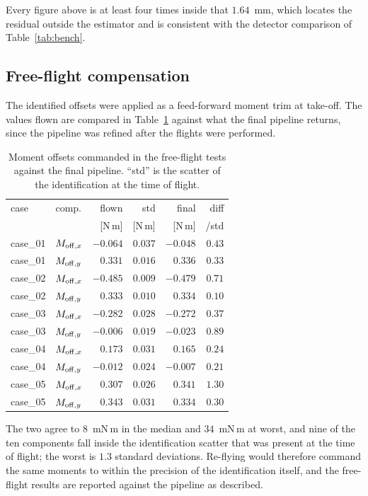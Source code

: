 Every figure above is at least four times inside that $1.64$~mm, which
locates the residual outside the estimator and is consistent with the
detector comparison of Table~\ref{tab:bench}.

\subsection{Free-flight compensation}

The identified offsets were applied as a feed-forward moment trim at
take-off. The values flown are compared in Table~\ref{tab:flown}
against what the final pipeline returns, since the pipeline was
refined after the flights were performed.

\begin{table}[t]
\centering
\caption{Moment offsets commanded in the free-flight tests against the
final pipeline. ``std'' is the scatter of the identification at the
time of flight.}
\label{tab:flown}
\small
\setlength{\tabcolsep}{4pt}
\begin{tabular}{@{}ll rrr r@{}}
\hline
case & comp. & flown & std & final & diff \\
 & & [N\,m] & [N\,m] & [N\,m] & /std \\
\hline
case\_01 & $M_{{\rm off},x}$ & $-0.064$ & $0.037$ & $-0.048$ & $0.43$\\
case\_01 & $M_{{\rm off},y}$ & $0.331$  & $0.016$ & $0.336$  & $0.33$\\
case\_02 & $M_{{\rm off},x}$ & $-0.485$ & $0.009$ & $-0.479$ & $0.71$\\
case\_02 & $M_{{\rm off},y}$ & $0.333$  & $0.010$ & $0.334$  & $0.10$\\
case\_03 & $M_{{\rm off},x}$ & $-0.282$ & $0.028$ & $-0.272$ & $0.37$\\
case\_03 & $M_{{\rm off},y}$ & $-0.006$ & $0.019$ & $-0.023$ & $0.89$\\
case\_04 & $M_{{\rm off},x}$ & $0.173$  & $0.031$ & $0.165$  & $0.24$\\
case\_04 & $M_{{\rm off},y}$ & $-0.012$ & $0.024$ & $-0.007$ & $0.21$\\
case\_05 & $M_{{\rm off},x}$ & $0.307$  & $0.026$ & $0.341$  & $1.30$\\
case\_05 & $M_{{\rm off},y}$ & $0.343$  & $0.031$ & $0.334$  & $0.30$\\
\hline
\end{tabular}
\end{table}

The two agree to $8$~mN\,m in the median and $34$~mN\,m at worst, and
nine of the ten components fall inside the identification scatter that
was present at the time of flight; the worst is $1.3$ standard
deviations. Re-flying would therefore command the same moments to
within the precision of the identification itself, and the free-flight
results are reported against the pipeline as described.

